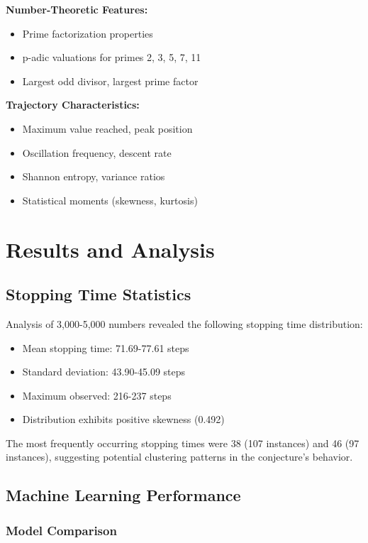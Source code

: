 \documentclass[12pt,a4paper]{article}
\begin{document}
\textbf{Number-Theoretic Features:}
\begin{itemize}
\item Prime factorization properties
\item p-adic valuations for primes 2, 3, 5, 7, 11
\item Largest odd divisor, largest prime factor
\end{itemize}

\textbf{Trajectory Characteristics:}
\begin{itemize}
\item Maximum value reached, peak position
\item Oscillation frequency, descent rate
\item Shannon entropy, variance ratios
\item Statistical moments (skewness, kurtosis)
\end{itemize}

\section{Results and Analysis}

\subsection{Stopping Time Statistics}

Analysis of 3,000-5,000 numbers revealed the following stopping time distribution:
\begin{itemize}
\item Mean stopping time: 71.69-77.61 steps
\item Standard deviation: 43.90-45.09 steps
\item Maximum observed: 216-237 steps
\item Distribution exhibits positive skewness (0.492)
\end{itemize}

The most frequently occurring stopping times were 38 (107 instances) and 46 (97 instances), suggesting potential clustering patterns in the conjecture's behavior.

\subsection{Machine Learning Performance}

\subsubsection{Model Comparison}
\end{document}
